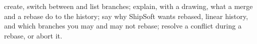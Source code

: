 \begin{levelcheck}
\begin{itemize}
  \can create, switch between and list branches;
  \can explain, with a drawing, what a merge and a rebase do to the history;
  \can say why ShipSoft wants rebased, linear history, and which branches you
       may and may not rebase;
  \can resolve a conflict during a rebase, or abort it.
\end{itemize}
\end{levelcheck}
